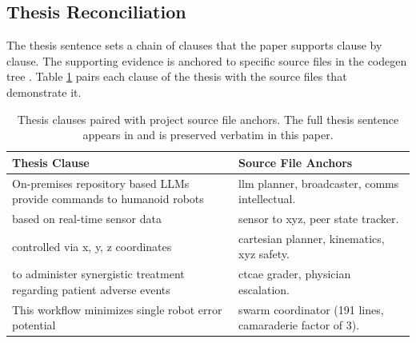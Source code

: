%
%

\begin{sectionaccent}

\subsection{Thesis Reconciliation}
\label{sec:discussion-thesis}

The thesis sentence sets a chain of clauses that the paper supports
clause by clause. The supporting evidence is anchored to specific
source files in the codegen tree
\cite{kawchak_2026_humanoid_instructions}. Table
\ref{tbl:thesis-anchors} pairs each clause of the thesis with the
source files that demonstrate it.

\begin{table}[H]
\captionsetup{type=table}
\caption{Thesis clauses paired with project source file anchors. The
full thesis sentence appears in
 and is preserved verbatim in this
paper.}
\label{tbl:thesis-anchors}
\small
\begin{tabular}{>{\raggedright\arraybackslash}p{6cm}
                >{\raggedright\arraybackslash}p{9cm}}
\toprule
\textbf{Thesis Clause} & \textbf{Source File Anchors} \\
\midrule
On-premises repository based LLMs provide commands to humanoid robots & llm planner, broadcaster, comms intellectual. \\
based on real-time sensor data & sensor to xyz, peer state tracker. \\
controlled via x, y, z coordinates & cartesian planner, kinematics, xyz safety. \\
to administer synergistic treatment regarding patient adverse events & ctcae grader, physician escalation. \\
This workflow minimizes single robot error potential & swarm coordinator (191 lines, camaraderie factor of 3). \\
\bottomrule
\end{tabular}
\end{table}


\end{sectionaccent}
